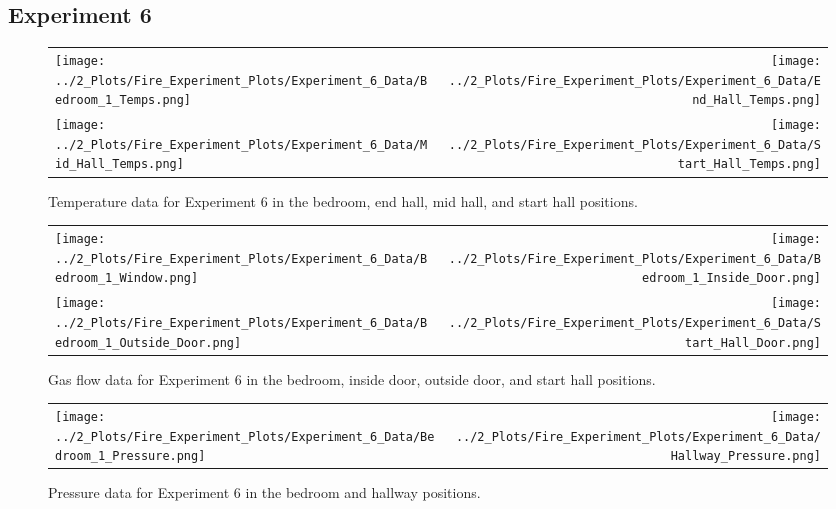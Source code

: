 \documentclass[12pt,oneside]{book}
\begin{document}
\begin{appendices}
\clearpage

\subsection*{Experiment 6}
\label{app:Experiment_6}

\begin{figure}[!ht]
\begin{tabular*}{\textwidth}{lr}
\texttt{[image: ../2\_Plots/Fire\_Experiment\_Plots/Experiment\_6\_Data/Bedroom\_1\_Temps.png]} &
\texttt{[image: ../2\_Plots/Fire\_Experiment\_Plots/Experiment\_6\_Data/End\_Hall\_Temps.png]} \\
\texttt{[image: ../2\_Plots/Fire\_Experiment\_Plots/Experiment\_6\_Data/Mid\_Hall\_Temps.png]} &
\texttt{[image: ../2\_Plots/Fire\_Experiment\_Plots/Experiment\_6\_Data/Start\_Hall\_Temps.png]} \\
\end{tabular*}
\caption[Experiment 6 Temperatures]{Temperature data for Experiment 6 in the bedroom, end hall, mid hall, and start hall positions.}
\end{figure}

\clearpage

\begin{figure}[!ht]
\begin{tabular*}{\textwidth}{lr}
\texttt{[image: ../2\_Plots/Fire\_Experiment\_Plots/Experiment\_6\_Data/Bedroom\_1\_Window.png]} &
\texttt{[image: ../2\_Plots/Fire\_Experiment\_Plots/Experiment\_6\_Data/Bedroom\_1\_Inside\_Door.png]} \\
\texttt{[image: ../2\_Plots/Fire\_Experiment\_Plots/Experiment\_6\_Data/Bedroom\_1\_Outside\_Door.png]} &
\texttt{[image: ../2\_Plots/Fire\_Experiment\_Plots/Experiment\_6\_Data/Start\_Hall\_Door.png]} \\
\end{tabular*}
\caption[Experiment 6 Gas Flows]{Gas flow data for Experiment 6 in the bedroom, inside door, outside door, and start hall positions.}
\end{figure}

\clearpage

\begin{figure}[!ht]
\begin{tabular*}{\textwidth}{lr}
\texttt{[image: ../2\_Plots/Fire\_Experiment\_Plots/Experiment\_6\_Data/Bedroom\_1\_Pressure.png]} &
\texttt{[image: ../2\_Plots/Fire\_Experiment\_Plots/Experiment\_6\_Data/Hallway\_Pressure.png]} \\
\end{tabular*}
\caption[Experiment 6 Pressures]{Pressure data for Experiment 6 in the bedroom and hallway positions.}
\end{figure}

\clearpage

\end{appendices}
\end{document}
